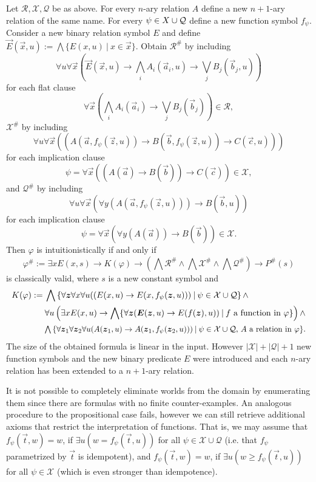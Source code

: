 \documentclass[runningheads]{llncs}
\begin{document}
\begin{theorem}\label{thm:fo-translation}
	Let $\mathcal R,\mathcal X,\mathcal Q$ be as above. For every $n$-ary relation $A$ define a new $n+1$-ary relation of the same name. For every $\psi\in\mathcal \mathcal X\cup\mathcal Q$ define a new function symbol $f_\psi$. Consider a new binary relation symbol $E$ and define $\vec E(\vec x, u) := \bigwedge\{E(x, u)\:|\:x\in\vec x\}$. Obtain $\mathcal R^\#$ by including
	$$
		\forall u\forall \vec x(\vec E(\vec x, u)\to\bigwedge_i A_i(\vec a_i, u)\to\bigvee_j B_j(\vec b_j, u))
	$$
 	for each flat clause 
 	$$
 		\forall \vec x(\bigwedge_i A_i(\vec a_i)\to\bigvee_j B_j(\vec b_j))\in\mathcal R,
 	$$
 	$\mathcal X^\#$ by including
 	$$
 		\forall u\forall \vec x((A(\vec a, f_\psi(\vec z, u))\to B(\vec b, f_\psi(\vec z, u))\to C(\vec c, u)))
 	$$
 	for each implication clause 
	$$
		\psi = \forall \vec x((A(\vec a)\to B(\vec b))\to C(\vec c))\in\mathcal X,
	$$
	and $\mathcal Q^\#$ by including
	$$
		\forall u\forall \vec x(\forall y(A(\vec a, f_\psi(\vec z, u)))\to B(\vec b, u))
	$$
	for each implication clause 
	$$
		\psi = \forall \vec x(\forall y(A(\vec a))\to B(\vec b))\in\mathcal X.
	$$
	Then $\varphi$ is intuitionistically if and only if
	$$
		\varphi^\# := \exists xE(x, s)\to K(\varphi)\to \left(\bigwedge\mathcal R^\#\wedge\bigwedge\mathcal X^\#\wedge\bigwedge\mathcal Q^\#\right)\to P^\#(s)
	$$
	is classically valid, where $s$ is a new constant symbol and
	\begin{align*}
		K(\varphi) := &\:\bigwedge\left\{\forall\vec z\forall x\forall u((E(x, u)\to E(x, f_\psi(\vec z, u)))\:|\:\psi\in\mathcal X\cup\mathcal Q\right\}\wedge\\
		&\:\forall u\left(\exists xE(x, u)\to \bigwedge\{\forall\vec z(\vec E(\vec z, u)\to E(f(\vec z), u))\:|\:\text{$f$ a function in $\varphi$}\}\right)\wedge\\
		&\resizebox{.9\hsize}{!}{$\:\bigwedge\left\{\forall\vec z_1\forall \vec z_2\forall u(A(\vec z_1, u)\to A(\vec z_1, f_\psi(\vec z_2, u)))\:|\:\text{$\psi\in\mathcal X\cup\mathcal Q$, $A$ a relation in $\varphi$}\right\}$.}
	\end{align*}
	The size of the obtained formula is linear in the input. However $|\mathcal X| + |\mathcal Q| + 1$ new function symbols and the new binary predicate $E$ were introduced and each $n$-ary relation has been extended to a $n+1$-ary relation.
\end{theorem}

It is not possible to completely eliminate worlds from the domain by enumerating them since there are formulas with no finite counter-examples. An analogous procedure to the propositional case fails, however we can still retrieve additional axioms that restrict the interpretation of functions. That is, we may assume that $f_\psi(\vec t, w) = w$, if $\exists u(w = f_\psi(\vec t, u))$ for all $\psi\in\mathcal X\cup\mathcal Q$ (i.e. that $f_\psi$ parametrized by $\vec t$ is idempotent), and $f_\psi(\vec t, w) = w$, if $\exists u(w \geq f_\psi(\vec t, u))$ for all $\psi\in\mathcal X$ (which is even stronger than idempotence).
\end{document}

